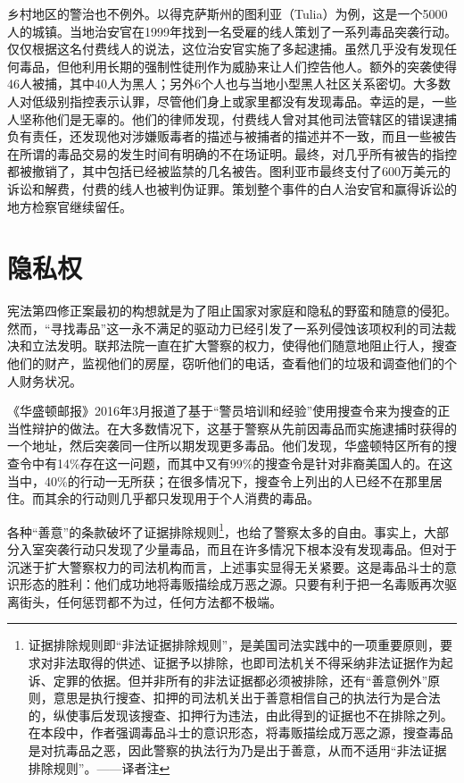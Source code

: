 \documentclass[fontset=fandol, a4paper, 12pt, openright]{ctexbook}
\begin{document}
乡村地区的警治也不例外。以得克萨斯州的图利亚（Tulia）为例，这是一个5000人的城镇。当地治安官在1999年找到一名受雇的线人策划了一系列毒品突袭行动。仅仅根据这名付费线人的说法，这位治安官实施了多起逮捕。虽然几乎没有发现任何毒品，但他利用长期的强制性徒刑作为威胁来让人们控告他人。额外的突袭使得46人被捕，其中40人为黑人；另外6个人也与当地小型黑人社区关系密切。大多数人对低级别指控表示认罪，尽管他们身上或家里都没有发现毒品。幸运的是，一些人坚称他们是无辜的。他们的律师发现，付费线人曾对其他司法管辖区的错误逮捕负有责任，还发现他对涉嫌贩毒者的描述与被捕者的描述并不一致，而且一些被告在所谓的毒品交易的发生时间有明确的不在场证明。最终，对几乎所有被告的指控都被撤销了，其中包括已经被监禁的几名被告。图利亚市最终支付了600万美元的诉讼和解费，付费的线人也被判伪证罪。策划整个事件的白人治安官和赢得诉讼的地方检察官继续留任。

\section{隐私权}

宪法第四修正案最初的构想就是为了阻止国家对家庭和隐私的野蛮和随意的侵犯。然而，“寻找毒品”这一永不满足的驱动力已经引发了一系列侵蚀该项权利的司法裁决和立法发明。联邦法院一直在扩大警察的权力，使得他们随意地阻止行人，搜查他们的财产，监视他们的房屋，窃听他们的电话，查看他们的垃圾和调查他们的个人财务状况。

《华盛顿邮报》2016年3月报道了基于“警员培训和经验”使用搜查令来为搜查的正当性辩护的做法。在大多数情况下，这基于警察从先前因毒品而实施逮捕时获得的一个地址，然后突袭同一住所以期发现更多毒品。他们发现，华盛顿特区所有的搜查令中有14\%存在这一问题，而其中又有99\%的搜查令是针对非裔美国人的。在这当中，40\%的行动一无所获；在很多情况下，搜查令上列出的人已经不在那里居住。而其余的行动则几乎都只发现用于个人消费的毒品。

各种“善意”的条款破坏了证据排除规则\footnote{证据排除规则即“非法证据排除规则”，是美国司法实践中的一项重要原则，要求对非法取得的供述、证据予以排除，也即司法机关不得采纳非法证据作为起诉、定罪的依据。但并非所有的非法证据都必须被排除，还有“善意例外”原则，意思是执行搜查、扣押的司法机关出于善意相信自己的执法行为是合法的，纵使事后发现该搜查、扣押行为违法，由此得到的证据也不在排除之列。在本段中，作者强调毒品斗士的意识形态，将毒贩描绘成万恶之源，搜查毒品是对抗毒品之恶，因此警察的执法行为乃是出于善意，从而不适用“非法证据排除规则”。——译者注}，也给了警察太多的自由。事实上，大部分入室突袭行动只发现了少量毒品，而且在许多情况下根本没有发现毒品。但对于沉迷于扩大警察权力的司法机构而言，上述事实显得无关紧要。这是毒品斗士的意识形态的胜利：他们成功地将毒贩描绘成万恶之源。只要有利于把一名毒贩再次驱离街头，任何惩罚都不为过，任何方法都不极端。
\end{document}
